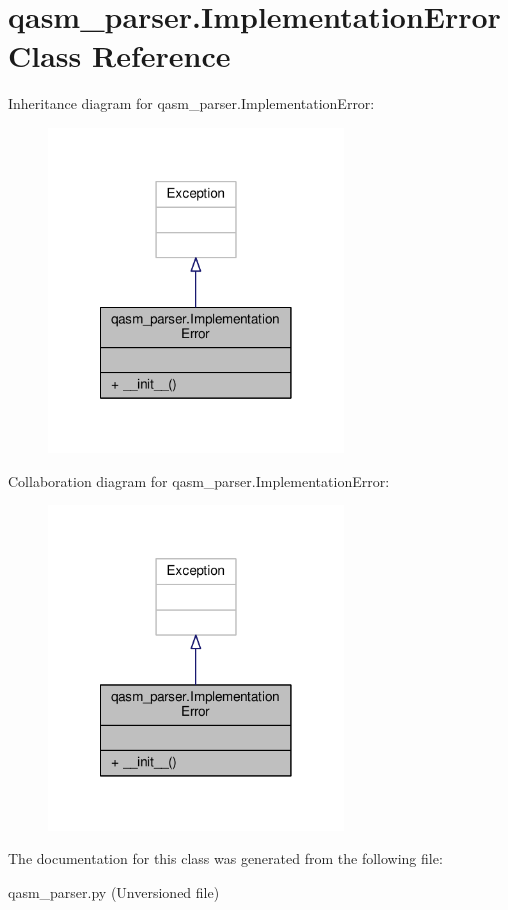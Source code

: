 \hypertarget{classqasm__parser_1_1ImplementationError}{\section{qasm\-\_\-parser.\-Implementation\-Error Class Reference}
\label{classqasm__parser_1_1ImplementationError}
}


Inheritance diagram for qasm\-\_\-parser.\-Implementation\-Error\-:
\nopagebreak
\begin{figure}[H]
\begin{center}
\leavevmode
\includegraphics[width=222pt]{d5/d9d/classqasm__parser_1_1ImplementationError__inherit__graph}
\end{center}
\end{figure}


Collaboration diagram for qasm\-\_\-parser.\-Implementation\-Error\-:
\nopagebreak
\begin{figure}[H]
\begin{center}
\leavevmode
\includegraphics[width=222pt]{d4/d04/classqasm__parser_1_1ImplementationError__coll__graph}
\end{center}
\end{figure}


The documentation for this class was generated from the following file\-:\begin{DoxyCompactItemize}
\item 
qasm\-\_\-parser.\-py (\-Unversioned file)\end{DoxyCompactItemize}
